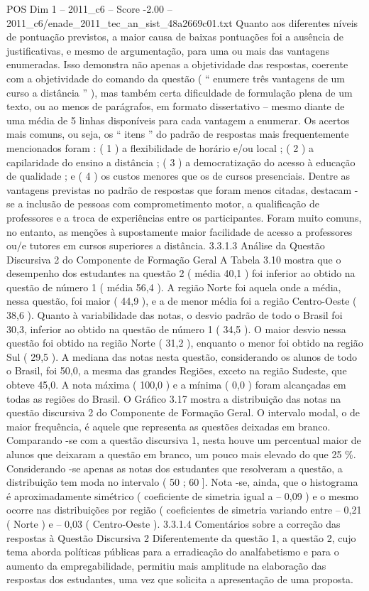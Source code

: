 \begin{textsample}{POS Dim 1 – 2011\_c6 – Score -2.00 – 2011\_c6/enade\_2011\_tec\_an\_sist\_48a2669c01.txt}
Quanto aos diferentes níveis de pontuação previstos, a maior causa de baixas pontuações foi a ausência de justificativas, e mesmo de argumentação, para uma ou mais das vantagens enumeradas.
Isso demonstra não apenas a objetividade das respostas, coerente com a objetividade do comando da questão ( “ enumere três vantagens de um curso a distância ” ), mas também certa dificuldade de formulação plena de um texto, ou ao menos de parágrafos, em formato dissertativo – mesmo diante de uma média de 5 linhas disponíveis para cada vantagem a enumerar.
Os acertos mais comuns, ou seja, os “ itens ” do padrão de respostas mais frequentemente mencionados foram : ( 1 ) a flexibilidade de horário e/ou local ; ( 2 ) a capilaridade do ensino a distância ; ( 3 ) a democratização do acesso à educação de qualidade ; e ( 4 ) os custos menores que os de cursos presenciais.
Dentre as vantagens previstas no padrão de respostas que foram menos citadas, destacam -se a inclusão de pessoas com comprometimento motor, a qualificação de professores e a troca de experiências entre os participantes.
Foram muito comuns, no entanto, as menções à supostamente maior facilidade de acesso a professores ou/e tutores em cursos superiores a distância. 3.3.1.3 Análise da Questão Discursiva 2 do Componente de Formação Geral A Tabela 3.10 mostra que o desempenho dos estudantes na questão 2 ( média 40,1 ) foi inferior ao obtido na questão de número 1 ( média 56,4 ).
A região Norte foi aquela onde a média, nessa questão, foi maior ( 44,9 ), e a de menor média foi a região Centro-Oeste ( 38,6 ).
Quanto à variabilidade das notas, o desvio padrão de todo o Brasil foi 30,3, inferior ao obtido na questão de número 1 ( 34,5 ).
O maior desvio nessa questão foi obtido na região Norte ( 31,2 ), enquanto o menor foi obtido na região Sul ( 29,5 ).
A mediana das notas nesta questão, considerando os alunos de todo o Brasil, foi 50,0, a mesma das grandes Regiões, exceto na região Sudeste, que obteve 45,0.
A nota máxima ( 100,0 ) e a mínima ( 0,0 ) foram alcançadas em todas as regiões do Brasil.
O Gráfico 3.17 mostra a distribuição das notas na questão discursiva 2 do Componente de Formação Geral.
O intervalo modal, o de maior frequência, é aquele que representa as questões deixadas em branco.
Comparando -se com a questão discursiva 1, nesta houve um percentual maior de alunos que deixaram a questão em branco, um pouco mais elevado do que 25 \%.
Considerando -se apenas as notas dos estudantes que resolveram a questão, a distribuição tem moda no intervalo ( 50 ; 60 ].
Nota -se, ainda, que o histograma é aproximadamente simétrico ( coeficiente de simetria igual a – 0,09 ) e o mesmo ocorre nas distribuições por região ( coeficientes de simetria variando entre – 0,21 ( Norte ) e – 0,03 ( Centro-Oeste ). 3.3.1.4 Comentários sobre a correção das respostas à Questão Discursiva 2 Diferentemente da questão 1, a questão 2, cujo tema aborda políticas públicas para a erradicação do analfabetismo e para o aumento da empregabilidade, permitiu mais amplitude na elaboração das respostas dos estudantes, uma vez que solicita a apresentação de uma proposta.

\end{textsample}
